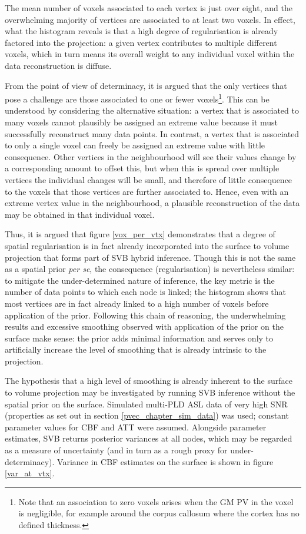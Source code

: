 The mean number of voxels associated to each vertex is just over eight, and the overwhelming majority of vertices are associated to at least two voxels. In effect, what the histogram reveals is that a high degree of regularisation is already factored into the projection: a given vertex contributes to multiple different voxels, which in turn means its overall weight to any individual voxel within the data reconstruction is diffuse. 

From the point of view of determinacy, it is argued that the only vertices that pose a challenge are those associated to one or fewer voxels\footnote{Note that an association to zero voxels arises when the GM PV in the voxel is negligible, for example around the corpus callosum where the cortex has no defined thickness.}. This can be understood by considering the alternative situation: a vertex that is associated to many voxels cannot plausibly be assigned an extreme value because it must successfully reconstruct many data points. In contrast, a vertex that is associated to only a single voxel can freely be assigned an extreme value with little consequence. Other vertices in the neighbourhood will see their values change by a corresponding amount to offset this, but when this is spread over multiple vertices the individual changes will be small, and therefore of little consequence to the voxels that those vertices are further associated to. Hence, even with an extreme vertex value in the neighbourhood, a plausible reconstruction of the data may be obtained in that individual voxel. 

Thus, it is argued that figure \ref{vox_per_vtx} demonstrates that a degree of spatial regularisation is in fact already incorporated into the surface to volume projection that forms part of SVB hybrid inference. Though this is not the same as a spatial prior \textit{per se}, the consequence (regularisation) is nevertheless similar: to mitigate the under-determined nature of inference, the key metric is the number of data points to which each node is linked; the histogram shows that most vertices are in fact already linked to a high number of voxels before application of the prior. Following this chain of reasoning, the underwhelming results and excessive smoothing observed with application of the prior on the surface make sense: the prior adds minimal information and serves only to artificially increase the level of smoothing that is already intrinsic to the projection. 

The hypothesis that a high level of smoothing is already inherent to the surface to volume projection may be investigated by running SVB inference without the spatial prior on the surface. Simulated multi-PLD ASL data of very high SNR (properties as set out in section \ref{pvec_chapter_sim_data}) was used; constant parameter values for CBF and ATT were assumed. Alongside parameter estimates, SVB returns posterior variances at all nodes, which may be regarded as a measure of uncertainty (and in turn as a rough proxy for under-determinacy). Variance in CBF estimates on the surface is shown in figure \ref{var_at_vtx}. 

